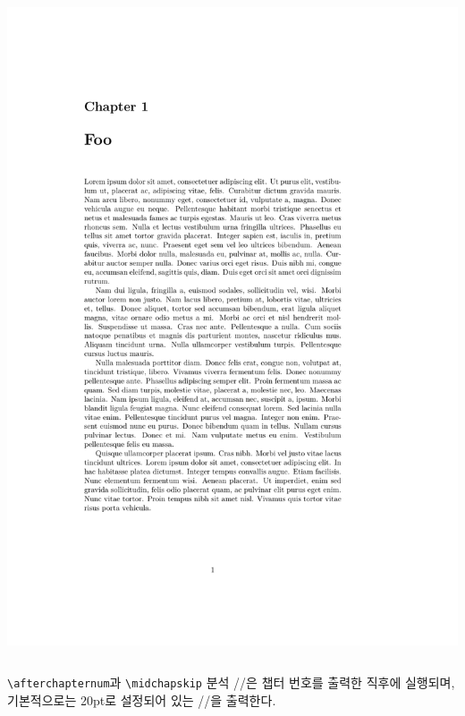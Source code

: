 \documentclass{beamer}
\def\tbs{\textbackslash}
\begin{document}
\begin{frame}[fragile]
\begin{overprint}
\begin{columns}
      \begin{column}{0.5\textwidth}
        \begin{latexcode}
          \renewcommand*{\chapterheadstart}{}
        \end{latexcode}
        \begin{center}
          \includegraphics[frame,page=1,width=0.8\linewidth]{chapterheadstart-3}
        \end{center}
      \end{column}
    \end{columns}
  \end{overprint}
\end{frame}

\begin{frame}[fragile]
  {\texttt{\tbs afterchapternum}과 \texttt{\tbs midchapskip} 분석}
  \ltxverb/\afterchapternum/은 챕터 번호를 출력한 직후에 실행되며, 기본적으로는
  20pt로 설정되어 있는 \ltxverb/\midchapskip/을 출력한다.
\end{frame}
\end{document}
